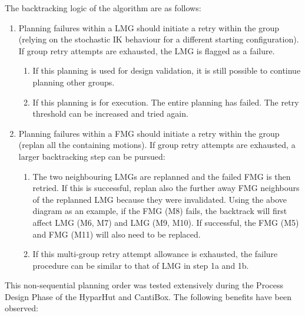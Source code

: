 \documentclass[11pt]{book}
\begin{document}
The backtracking logic of the algorithm are as follows:

\begin{enumerate}
	\item Planning failures within a LMG should initiate a retry within the group (relying on the stochastic IK behaviour for a different starting configuration). If group retry attempts are exhausted, the LMG is flagged as a failure. 

\begin{enumerate}
	\item If this planning is used for design validation, it is still possible to continue planning other groups. 

	\item If this planning is for execution. The entire planning has failed. The retry threshold can be increased and tried again.

\end{enumerate}
	\item Planning failures within a FMG should initiate a retry within the group (replan all the containing motions). If group retry attempts are exhausted, a larger backtracking step can be pursued:

\begin{enumerate}
	\item The two neighbouring LMGs are replanned and the failed FMG is then retried. If this is successful, replan also the further away FMG neighbours of the replanned LMG because they were invalidated. Using the above diagram as an example, if the FMG (M8) fails, the backtrack will first affect LMG (M6, M7) and LMG (M9, M10). If successful, the FMG (M5) and FMG (M11) will also need to be replaced.

	\item If this multi-group retry attempt allowance is exhausted, the failure procedure can be similar to that of LMG in step 1a and 1b.

\end{enumerate}
\end{enumerate}
This non-sequential planning order was tested extensively during the Process Design Phase of the HyparHut and CantiBox. The following benefits have been observed:
\end{document}

